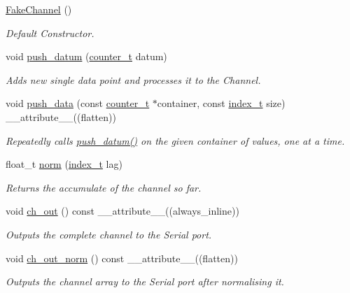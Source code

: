 \begin{DoxyCompactItemize}
\item 
\hyperlink{classFakeChannel_a7b6ecb79fe6460f07d395c4df4b30cda}{Fake\+Channel} ()
\begin{DoxyCompactList}\small\item\em Default Constructor. \end{DoxyCompactList}\item 
void \hyperlink{classFakeChannel_ad40cc96be3b22a6d0111b9cc8f30ffcf}{push\+\_\+datum} (\hyperlink{types_8hpp_a22f279793847eba127de149437848c48}{counter\+\_\+t} datum)
\begin{DoxyCompactList}\small\item\em Adds new {\itshape single} data point and processes it to the {\ttfamily Channel}. \end{DoxyCompactList}\item 
void \hyperlink{classFakeChannel_a0b367e4109f7143261f44e5fde277181}{push\+\_\+data} (const \hyperlink{types_8hpp_a22f279793847eba127de149437848c48}{counter\+\_\+t} $\ast$container, const \hyperlink{types_8hpp_ab41b824af8e088d090c0b9e60f536c9d}{index\+\_\+t} size) \+\_\+\+\_\+attribute\+\_\+\+\_\+((flatten))
\begin{DoxyCompactList}\small\item\em Repeatedly calls {\ttfamily \hyperlink{classFakeChannel_ad40cc96be3b22a6d0111b9cc8f30ffcf}{push\+\_\+datum()}} on the given container of values, one at a time. \end{DoxyCompactList}\item 
float\+\_\+t \hyperlink{classFakeChannel_a2c7edb717127d703f71e50df8a0b391c}{norm} (\hyperlink{types_8hpp_ab41b824af8e088d090c0b9e60f536c9d}{index\+\_\+t} lag)
\begin{DoxyCompactList}\small\item\em Returns the accumulate of the channel so far. \end{DoxyCompactList}\item 
void \hyperlink{classFakeChannel_a4690f6aaaeded8dd776aab720fdfbd8b}{ch\+\_\+out} () const \+\_\+\+\_\+attribute\+\_\+\+\_\+((always\+\_\+inline))
\begin{DoxyCompactList}\small\item\em Outputs the complete channel to the Serial port. \end{DoxyCompactList}\item 
void \hyperlink{classFakeChannel_a89dc67c3d19480927f1c07f7a96a1674}{ch\+\_\+out\+\_\+norm} () const \+\_\+\+\_\+attribute\+\_\+\+\_\+((flatten))
\begin{DoxyCompactList}\small\item\em Outputs the channel array to the Serial port after normalising it. \end{DoxyCompactList}\end{DoxyCompactItemize}
